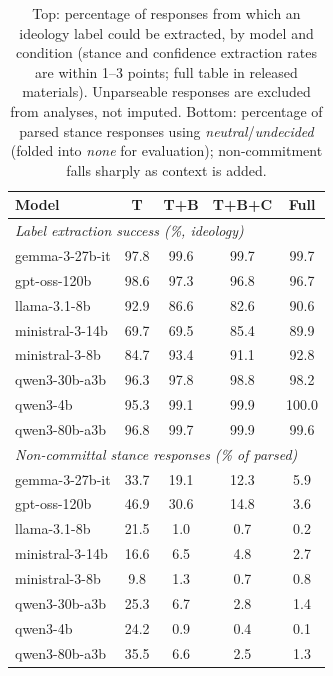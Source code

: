 \documentclass[11pt]{article}
\begin{document}
\begin{table}[h]
\centering
\small
\setlength{\tabcolsep}{3.6pt}
\begin{tabular}{lcccc}
\toprule
Model & T & T+B & T+B+C & Full \\
\midrule
\multicolumn{5}{l}{\emph{Label extraction success (\%, ideology)}}\\
gemma-3-27b-it  & 97.8 & 99.6 & 99.7 & 99.7 \\
gpt-oss-120b    & 98.6 & 97.3 & 96.8 & 96.7 \\
llama-3.1-8b    & 92.9 & 86.6 & 82.6 & 90.6 \\
ministral-3-14b & 69.7 & 69.5 & 85.4 & 89.9 \\
ministral-3-8b  & 84.7 & 93.4 & 91.1 & 92.8 \\
qwen3-30b-a3b   & 96.3 & 97.8 & 98.8 & 98.2 \\
qwen3-4b        & 95.3 & 99.1 & 99.9 & 100.0 \\
qwen3-80b-a3b   & 96.8 & 99.7 & 99.9 & 99.6 \\
\midrule
\multicolumn{5}{l}{\emph{Non-committal stance responses (\% of parsed)}}\\
gemma-3-27b-it  & 33.7 & 19.1 & 12.3 & 5.9 \\
gpt-oss-120b    & 46.9 & 30.6 & 14.8 & 3.6 \\
llama-3.1-8b    & 21.5 &  1.0 &  0.7 & 0.2 \\
ministral-3-14b & 16.6 &  6.5 &  4.8 & 2.7 \\
ministral-3-8b  &  9.8 &  1.3 &  0.7 & 0.8 \\
qwen3-30b-a3b   & 25.3 &  6.7 &  2.8 & 1.4 \\
qwen3-4b        & 24.2 &  0.9 &  0.4 & 0.1 \\
qwen3-80b-a3b   & 35.5 &  6.6 &  2.5 & 1.3 \\
\bottomrule
\end{tabular}
\caption{Top: percentage of responses from which an ideology label could be extracted, by model and condition (stance and confidence extraction rates are within 1--3 points; full table in released materials). Unparseable responses are excluded from analyses, not imputed. Bottom: percentage of parsed stance responses using \emph{neutral}/\emph{undecided} (folded into \emph{none} for evaluation); non-commitment falls sharply as context is added.}
\label{tab:parserates}
\end{table}
\end{document}
